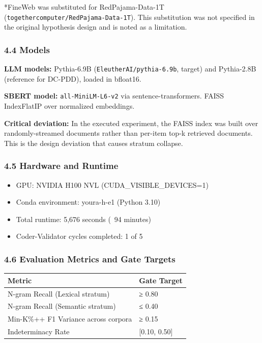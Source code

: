 *FineWeb was substituted for RedPajama-Data-1T (\texttt{togethercomputer/RedPajama-Data-1T}). This substitution was not specified in the original hypothesis design and is noted as a limitation.

\subsubsection{4.4 Models}

\textbf{LLM models:} Pythia-6.9B (\texttt{EleutherAI/pythia-6.9b}, target) and Pythia-2.8B (reference for DC-PDD), loaded in bfloat16.

\textbf{SBERT model:} \texttt{all-MiniLM-L6-v2} via sentence-transformers. FAISS IndexFlatIP over normalized embeddings.

\textbf{Critical deviation:} In the executed experiment, the FAISS index was built over randomly-streamed documents rather than per-item top-k retrieved documents. This is the design deviation that causes stratum collapse.

\subsubsection{4.5 Hardware and Runtime}

\begin{itemize}
\item GPU: NVIDIA H100 NVL (CUDA_VISIBLE_DEVICES=1)
\item Conda environment: youra-h-e1 (Python 3.10)
\item Total runtime: 5,676 seconds (~94 minutes)
\item Coder-Validator cycles completed: 1 of 5
\end{itemize}

\subsubsection{4.6 Evaluation Metrics and Gate Targets}

\begin{table}[htbp]
\centering
\begin{tabular}{ll}
\toprule
Metric & Gate Target \\
\midrule
N-gram Recall (Lexical stratum) & ≥ 0.80 \\
N-gram Recall (Semantic stratum) & ≤ 0.40 \\
Min-K\%++ F1 Variance across corpora & ≥ 0.15 \\
Indeterminacy Rate & [0.10, 0.50] \\
\bottomrule
\end{tabular}
\end{table}

